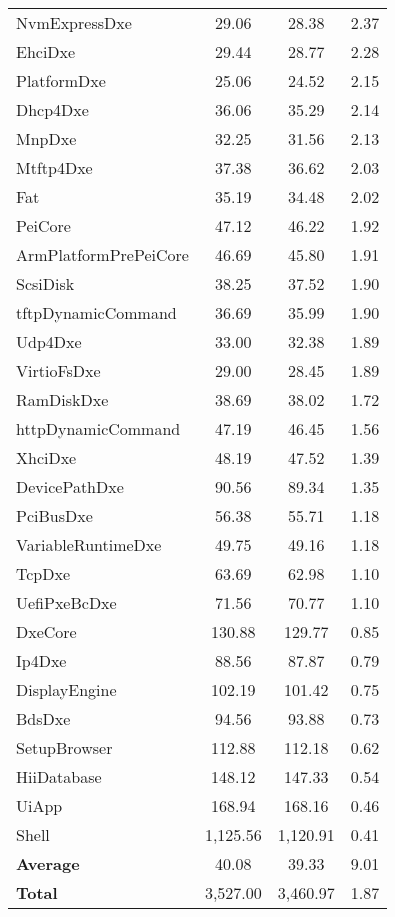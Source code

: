 \begin{longtable}{l c c c}
  NvmExpressDxe & 29.06 & 28.38 & 2.37\\
  EhciDxe & 29.44 & 28.77 & 2.28\\
  PlatformDxe & 25.06 & 24.52 & 2.15\\
  Dhcp4Dxe & 36.06 & 35.29 & 2.14\\
  MnpDxe & 32.25 & 31.56 & 2.13\\
  Mtftp4Dxe & 37.38 & 36.62 & 2.03\\
  Fat & 35.19 & 34.48 & 2.02\\
  PeiCore & 47.12 & 46.22 & 1.92\\
  ArmPlatformPrePeiCore & 46.69 & 45.80 & 1.91\\
  ScsiDisk & 38.25 & 37.52 & 1.90\\
  tftpDynamicCommand & 36.69 & 35.99 & 1.90\\
  Udp4Dxe & 33.00 & 32.38 & 1.89\\
  VirtioFsDxe & 29.00 & 28.45 & 1.89\\
  RamDiskDxe & 38.69 & 38.02 & 1.72\\
  httpDynamicCommand & 47.19 & 46.45 & 1.56\\
  XhciDxe & 48.19 & 47.52 & 1.39\\
  DevicePathDxe & 90.56 & 89.34 & 1.35\\
  PciBusDxe & 56.38 & 55.71 & 1.18\\
  VariableRuntimeDxe & 49.75 & 49.16 & 1.18\\
  TcpDxe & 63.69 & 62.98 & 1.10\\
  UefiPxeBcDxe & 71.56 & 70.77 & 1.10\\
  DxeCore & 130.88 & 129.77 & 0.85\\
  Ip4Dxe & 88.56 & 87.87 & 0.79\\
  DisplayEngine & 102.19 & 101.42 & 0.75\\
  BdsDxe & 94.56 & 93.88 & 0.73\\
  SetupBrowser & 112.88 & 112.18 & 0.62\\
  HiiDatabase & 148.12 & 147.33 & 0.54\\
  UiApp & 168.94 & 168.16 & 0.46\\
  Shell & 1,125.56 & 1,120.91 & 0.41\\
  \midrule
  \textbf{Average} & 40.08 & 39.33 & 9.01\\
  \textbf{Total} & 3,527.00 & 3,460.97 & 1.87\\
  \bottomrule
\end{longtable}
